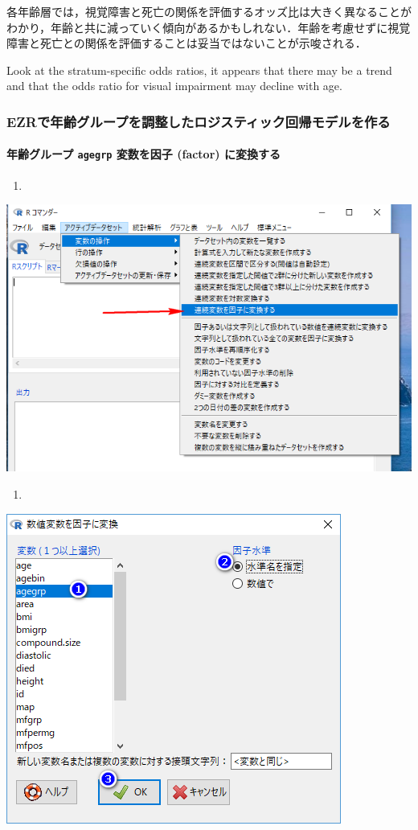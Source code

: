 \documentclass[11pt,]{problemset}
\let\oldparagraph\paragraph
\renewcommand{\paragraph}[1]{\oldparagraph{#1}\mbox{}}
\begin{document}
各年齢層では，視覚障害と死亡の関係を評価するオッズ比は大きく異なることがわかり，年齢と共に減っていく傾向があるかもしれない．年齢を考慮せずに視覚障害と死亡との関係を評価することは妥当ではないことが示唆される．

Look at the stratum-specific odds ratios, it appears that there may be a
trend and that the odds ratio for visual impairment may decline with
age.

\newpage
\vfill

\hypertarget{ezr}{%
\subsubsection{EZRで年齢グループを調整したロジスティック回帰モデルを作る}\label{ezr}}

\hypertarget{-agegrp--factor-}{%
\paragraph{\texorpdfstring{年齢グループ \texttt{agegrp} 変数を因子
(factor)
に変換する}{年齢グループ agegrp 変数を因子 (factor) に変換する}}\label{-agegrp--factor-}}

\begin{enumerate}
\def\labelenumi{\arabic{enumi}.}
\item
\end{enumerate}

\begin{center}\includegraphics[width=0.55\linewidth,height=0.5\textheight]{pic/mltlogstic00} \end{center}

\begin{enumerate}
\def\labelenumi{\arabic{enumi}.}
\setcounter{enumi}{1}
\item
\end{enumerate}

\begin{center}\includegraphics[width=0.55\linewidth,height=0.5\textheight]{pic/mltlogstic01} \end{center}
\end{document}
